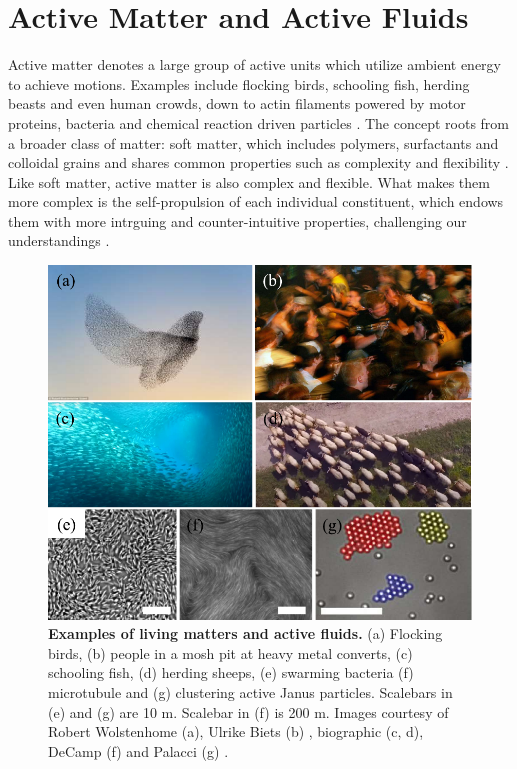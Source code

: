 \section{Active Matter and Active Fluids}
\label{active-fluids}

Active matter denotes a large group of active units which utilize ambient energy to achieve motions. Examples include flocking birds, schooling fish, herding beasts and even human crowds, down to actin filaments powered by motor proteins, bacteria and chemical reaction driven particles
\cite{Toner2005, Ramaswamy2010, Vicsek2012, Marchetti2013, Saintillan2013, Bechinger2016, Julicher2007}. The concept roots from a broader class of matter: soft matter, which includes polymers, surfactants and colloidal grains and shares common properties such as complexity and flexibility
\cite{DeGennes1992}. Like soft matter, active matter is also complex and flexible. What makes them more complex is the self-propulsion of each individual constituent, which endows them with more intrguing and counter-intuitive properties, challenging our understandings \cite{Glotzer2015}.

\begin{figure}[!htbp]
	\begin{center}
	\includegraphics[width=5.5 in]{Figs/1-Intro/1.pdf}
	\end{center}
	\caption[Figure 1.1: ]
	{
	\textbf{Examples of living matters and active fluids.}
  (a) Flocking birds, (b) people in a mosh pit at heavy metal converts, (c) schooling fish, (d) herding sheeps, (e) swarming bacteria (f) microtubule and (g) clustering active Janus particles.
  Scalebars in (e) and (g) are 10 \textmu m. Scalebar in (f) is 200 \textmu m. Images courtesy of Robert Wolstenhome (a), Ulrike Biets (b) \cite{Silverberg2013}, biographic (c, d), DeCamp (f) \cite{DeCamp2015} and Palacci (g) \cite{Palacci2013}.
	}
	\label{fig:living-matter-examples}
\end{figure}

